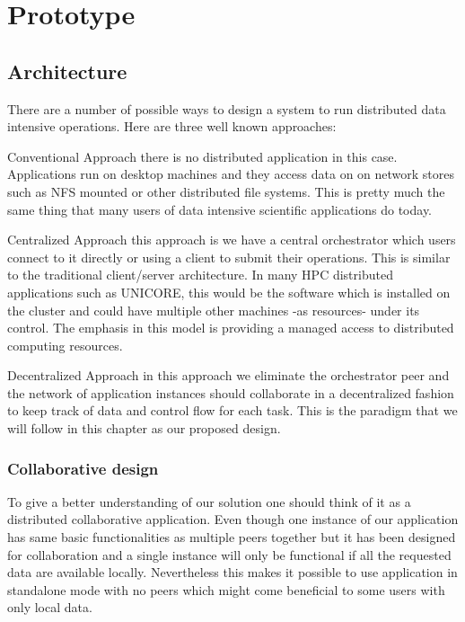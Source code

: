 \chapter{Prototype}
\label{cha:prototype}

\section{Architecture}
There are a number of possible ways to design a system to run distributed data intensive operations. Here are 
three well known approaches:
\begin{description}
\item{Conventional Approach} there is no distributed application in this case. Applications run on desktop machines
and they access data on on network stores such as NFS mounted or other distributed file systems. This is pretty much
the same thing that many users of data intensive scientific applications do today.

\item{Centralized Approach} this approach is we have a central orchestrator which users connect to it directly or
using a client to submit their operations. This is similar to the traditional client/server architecture. In 
many HPC distributed applications such as UNICORE, this would be the software which is installed on the cluster
and could have multiple other machines -as resources- under its control. The emphasis in this model is providing
a managed access to distributed computing resources.

\item{Decentralized Approach} in this approach we eliminate the orchestrator peer and the network of
application instances should collaborate in a decentralized fashion to keep track of data and control flow for each
task. This is the paradigm that we will follow in this chapter as our proposed design. 
\end{description}

\subsection{Collaborative design}
To give a better understanding of our solution one should think of it as a distributed collaborative application. 
Even though one instance of our application has same basic functionalities as multiple peers together
but it has been designed for collaboration and a single instance will only be functional if all the requested data are
available locally. Nevertheless this makes it possible to use application in standalone mode with no peers which might
come beneficial to some users with only local data.

